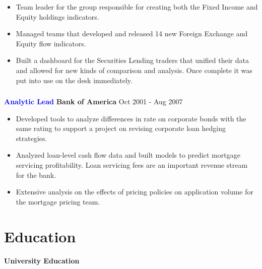 \documentclass[10pt, letterpaper]{article} %
\providecommand{\tightlist}{%
  \setlength{\itemsep}{0pt}\setlength{\parskip}{0pt}}
\begin{document}
{{{  \begin{itemize}
  \tightlist
  \item Team leader for the group responsible 
    for creating both the Fixed Income and Equity holdings indicators.
  \item Managed teams that developed and released 14 new Foreign Exchange and    Equity flow indicators.
  \item Built a
  dashboard for the Securities Lending traders that unified their data and
  allowed for new kinds of comparison and analysis.
   Once complete it was put into use on the desk immediately.    
  \end{itemize}

\vspace{-20pt}
\hypertarget{bofa}{\subsubsection{}\label{bofa}}
\textbf {\textcolor{blue}{Analytic Lead}} \hfill  
 \textbf{Bank of America} \hfill 
Oct 2001 -  Aug 2007

  \begin{itemize}
  \tightlist
  \item Developed tools to analyze differences in rate on corporate bonds with the same rating to support a project on revising corporate loan hedging strategies.

  \item Analyzed loan-level cash flow data and built models to predict     mortgage servicing profitability. Loan servicing fees are an important revenue stream for the bank.
  
  \item Extensive analysis on the effects of pricing policies on application volume for the mortgage pricing team.
  \end{itemize}


\hypertarget{education-and-activities}{
\section{\texorpdfstring{{\textbf{Education}}}{Education}}\label{education-and-activities}}

\hypertarget{university-education}{%
{\large \textbf{University Education}}\label{university-education}}

}}}
\end{document}
